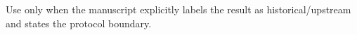 Use only when the manuscript explicitly labels the result as historical/upstream and states the protocol boundary.
